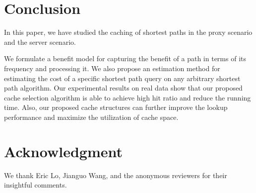 \documentclass{sig-alternate}
\newcommand{\spath}{SP\xspace}
\begin{document}







%
%










\section{Conclusion}\label{sec:conclusion}
%
In this paper, we have studied the caching of shortest paths in the proxy scenario and the server scenario.

We formulate a benefit model for capturing the benefit of a path in terms of its frequency and processing it.
We also propose an estimation method for estimating the cost of a specific shortest path query on any arbitrary
shortest path algorithm.
Our experimental results on real data show that our proposed cache selection algorithm is able to
achieve high hit ratio and reduce the running time.
Also, our proposed cache structures can further improve the lookup performance and maximize the utilization of cache space.




\section*{Acknowledgment}
%
We thank Eric Lo, Jianguo Wang, and the anonymous reviewers for their insightful comments.





\end{document}
